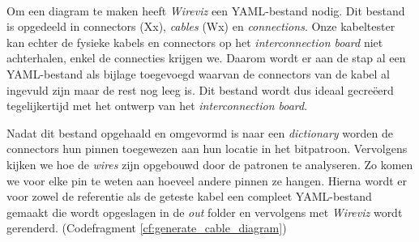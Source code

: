 \paragraph{}%

Om een diagram te maken heeft \textit{Wireviz} een \gls{YAML}-bestand nodig. Dit bestand is opgedeeld in connectors (Xx), \textit{cables} (Wx) en \textit{connections}. Onze kabeltester kan echter de fysieke kabels en connectors op het \textit{interconnection board} niet achterhalen, enkel de connecties krijgen we. Daarom wordt er aan de stap al een \gls{YAML}-bestand als bijlage toegevoegd waarvan de connectors van de kabel al ingevuld zijn maar de rest nog leeg is. Dit bestand wordt dus ideaal gecreëerd tegelijkertijd met het ontwerp van het \textit{interconnection board}. 

Nadat dit bestand opgehaald en omgevormd is naar een \textit{dictionary} worden de connectors hun pinnen toegewezen aan hun locatie in het bitpatroon. Vervolgens kijken we hoe de \textit{wires} zijn opgebouwd door de patronen te analyseren. Zo komen we voor elke pin te weten aan hoeveel andere pinnen ze hangen. Hierna wordt er voor zowel de referentie als de geteste kabel een compleet \gls{YAML}-bestand gemaakt die wordt opgeslagen in de \textit{out} folder en vervolgens met \textit{Wireviz} wordt gerenderd. (Codefragment \ref{cf:generate_cable_diagram})


